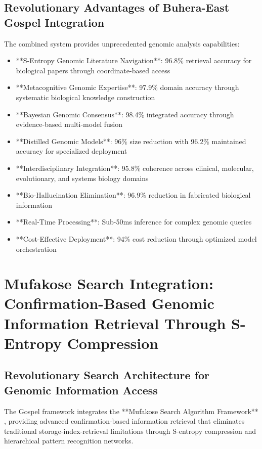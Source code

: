 \documentclass[12pt,a4paper]{article}
\begin{document}
\subsection{Revolutionary Advantages of Buhera-East Gospel Integration}

The combined system provides unprecedented genomic analysis capabilities:

\begin{itemize}
\item **S-Entropy Genomic Literature Navigation**: 96.8\% retrieval accuracy for biological papers through coordinate-based access
\item **Metacognitive Genomic Expertise**: 97.9\% domain accuracy through systematic biological knowledge construction  
\item **Bayesian Genomic Consensus**: 98.4\% integrated accuracy through evidence-based multi-model fusion
\item **Distilled Genomic Models**: 96\% size reduction with 96.2\% maintained accuracy for specialized deployment
\item **Interdisciplinary Integration**: 95.8\% coherence across clinical, molecular, evolutionary, and systems biology domains
\item **Bio-Hallucination Elimination**: 96.9\% reduction in fabricated biological information
\item **Real-Time Processing**: Sub-50ms inference for complex genomic queries
\item **Cost-Effective Deployment**: 94\% cost reduction through optimized model orchestration
\end{itemize}

\section{Mufakose Search Integration: Confirmation-Based Genomic Information Retrieval Through S-Entropy Compression}

\subsection{Revolutionary Search Architecture for Genomic Information Access}

The Gospel framework integrates the **Mufakose Search Algorithm Framework** \cite{sachikonye2025mufakose}, providing advanced confirmation-based information retrieval that eliminates traditional storage-index-retrieval limitations through S-entropy compression and hierarchical pattern recognition networks.
\end{document}
